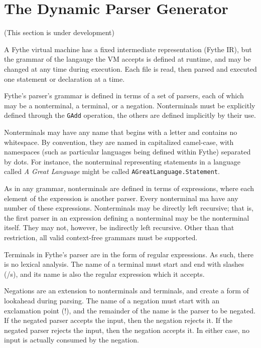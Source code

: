 \chapter{The Dynamic Parser Generator}\label{chap:parser}

(This section is under development)

A Fythe virtual machine has a fixed intermediate representation (Fythe IR), but
the grammar of the langauge the VM accepts is defined at runtime, and may be
changed at any time during execution. Each file is read, then parsed and
executed one statement or declaration at a time.

Fythe's parser's grammar is defined in terms of a set of parsers, each of which
may be a nonterminal, a terminal, or a negation. Nonterminals must be
explicitly defined through the \texttt{GAdd} operation, the others are defined
implicitly by their use.

Nonterminals may have any name that begins with a letter and contains no
whitespace. By convention, they are named in capitalized camel-case, with
namespaces (such as particular languages being defined within Fythe) separated
by dots. For instance, the nonterminal representing statements in a language
called \textit{A Great Language} might be called
\texttt{AGreatLanguage.Statement}.

As in any grammar, nonterminals are defined in terms of expressions, where each
element of the expression is another parser. Every nonterminal ma have any
number of these expressions. Nonterminals may be directly left recursive; that
is, the first parser in an expression defining a nonterminal may be the
nonterminal itself. They may not, however, be indirectly left recursive. Other
than that restriction, all valid context-free grammars must be supported.

Terminals in Fythe's parser are in the form of regular expressions. As such,
there is no lexical analysis. The name of a terminal must start and end with
slashes (/s), and its name is also the regular expression which it accepts.

Negations are an extension to nonterminals and terminals, and create a form of
lookahead during parsing. The name of a negation must start with an exclamation
point (!), and the remainder of the name is the parser to be negated. If the
negated parser accepts the input, then the negation rejects it. If the negated
parser rejects the input, then the negation accepts it. In either case, no
input is actually consumed by the negation.

